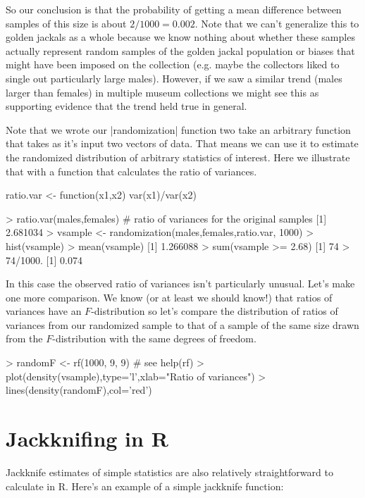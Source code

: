 So our conclusion is that the probability of getting a mean difference between samples of this size is about $2/1000=0.002$.  Note that we can't generalize this to golden jackals as a whole because we know nothing about whether these samples actually represent random samples of the golden jackal population or biases that might have been imposed on the collection (e.g. maybe the collectors liked to single out particularly large males). However, if we saw a similar trend (males larger than females) in multiple museum collections we might see this as supporting evidence that the trend held true in general.

Note that we wrote our |randomization| function two take an arbitrary function that takes as it's input two vectors of data. That means we can use it to estimate the randomized distribution of arbitrary statistics of interest. Here we illustrate that with a function that calculates the ratio of variances.

\begin{R}
ratio.var <- function(x1,x2){
    var(x1)/var(x2)
}    

> ratio.var(males,females)  # ratio of variances for the original samples
[1] 2.681034
> vsample <- randomization(males,females,ratio.var, 1000)
> hist(vsample)
> mean(vsample)
[1] 1.266088
> sum(vsample >= 2.68)
[1] 74
> 74/1000.
[1] 0.074
\end{R}    

In this case the observed ratio of variances isn't particularly unusual.  Let's make one more comparison. We know (or at least we should know!) that ratios of variances have an $F$-distribution so let's compare the distribution of ratios of variances from our randomized sample to that of a sample of the same size drawn from the $F$-distribution with the same degrees of freedom.

\begin{R}
> randomF <- rf(1000, 9, 9) # see help(rf)
> plot(density(vsample),type='l',xlab="Ratio of variances")
> lines(density(randomF),col='red')    
\end{R}


\section{Jackknifing in R}

Jackknife estimates of simple statistics are also relatively straightforward to calculate in R. Here's an example of a simple jackknife function:

